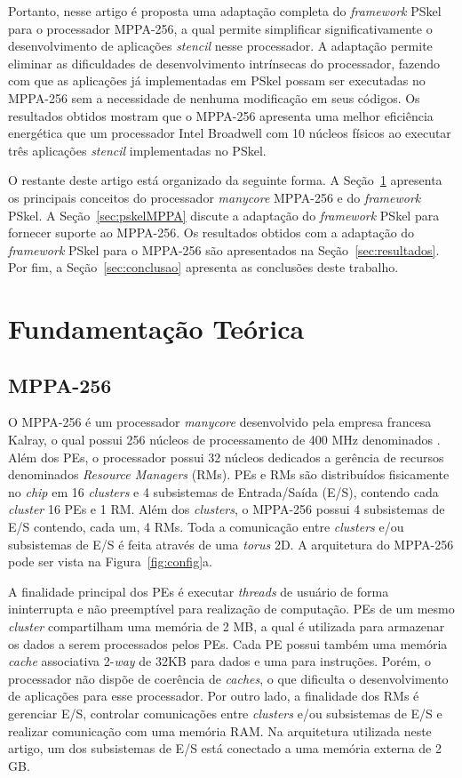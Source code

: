 \documentclass[12pt]{article}
\newcommand{\fw}{\textit{framework}\xspace}
\newcommand{\pskel}{PSkel\xspace}
\newcommand{\mppa}{MPPA-256\xspace}
\newcommand{\stencil}{\textit{stencil}\xspace}
\begin{document}
Portanto, nesse artigo é proposta uma adaptação completa do \fw \pskel para o
processador \mppa, a qual permite simplificar significativamente o
desenvolvimento de aplicações \stencil nesse processador. A adaptação permite
eliminar as dificuldades de desenvolvimento intrínsecas do processador, fazendo
com que as aplicações já implementadas em \pskel possam ser executadas no \mppa
sem a necessidade de nenhuma modificação em seus códigos. Os resultados obtidos
mostram que o \mppa apresenta uma melhor eficiência energética que um
processador Intel Broadwell com 10 núcleos físicos ao executar três aplicações
\stencil implementadas no \pskel.

O restante deste artigo está organizado da seguinte forma. A
Seção~\ref{sec:fundamentacao} apresenta os principais conceitos do processador
\textit{manycore} \mppa e do \fw \pskel. A Seção~\ref{sec:pskelMPPA} discute a
adaptação do \fw \pskel para fornecer suporte ao \mppa. Os resultados obtidos
com a adaptação do \fw \pskel para o \mppa são apresentados na
Seção~\ref{sec:resultados}. Por fim, a Seção~\ref{sec:conclusao} apresenta as
conclusões deste trabalho.

\section{Fundamentação Teórica}
\label{sec:fundamentacao}

\subsection{MPPA-256}
\label{subsec:mppa}

O \mppa é um processador \textit{manycore} desenvolvido pela empresa francesa
Kalray, o qual possui 256 núcleos de processamento de 400 MHz denominados \pes.
Além dos PEs, o processador possui 32 núcleos dedicados a gerência de recursos
denominados \textit{Resource Managers} (RMs). PEs e RMs são distribuídos
fisicamente no \textit{chip} em 16 \textit{clusters} e 4 subsistemas de
Entrada/Saída (E/S), contendo cada \textit{cluster} 16 PEs e 1 RM. Além dos
\textit{clusters}, o \mppa possui 4 subsistemas de E/S contendo, cada um, 4 RMs.
Toda a comunicação entre \textit{clusters} e/ou subsistemas de E/S é feita
através de uma \noc \textit{torus} 2D. A arquitetura do \mppa pode ser vista na
Figura~\ref{fig:config}a.

A finalidade principal dos PEs é executar \textit{threads} de usuário de forma
ininterrupta e não preemptível para realização de computação. PEs de um mesmo
\textit{cluster} compartilham uma memória de 2 MB, a qual é utilizada para
armazenar os dados a serem processados pelos PEs. Cada PE possui também uma
memória \textit{cache} associativa 2-\textit{way} de 32KB para dados e uma para
instruções. Porém, o processador não dispõe de coerência de \textit{caches}, o
que dificulta o desenvolvimento de aplicações para esse processador. Por outro
lado, a finalidade dos RMs é gerenciar E/S, controlar comunicações entre
\textit{clusters} e/ou subsistemas de E/S e realizar comunicação com uma memória
RAM. Na arquitetura utilizada neste artigo, um dos subsistemas de E/S está
conectado a uma memória externa \lpddr de 2 GB.
\end{document}
